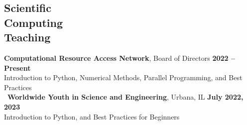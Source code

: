 \documentclass[margin,line]{resume}
\begin{document}
\begin{resume}
    \section{\mysidestyle Scientific\\Computing\\Teaching}
    \textbf{Computational Resource Access Network}, Board of Directors \hfill \textbf{2022 -- Present}\\
    Introduction to Python, Numerical Methods, Parallel Programming, and Best Practices \vspace{2mm}\\\
    \textbf{Worldwide Youth in Science and Engineering}, Urbana, IL \hfill \textbf{July 2022, 2023}\\
    Introduction to Python, and Best Practices for Beginners
                \vspace{2mm}\\





\end{resume}
\end{document}
